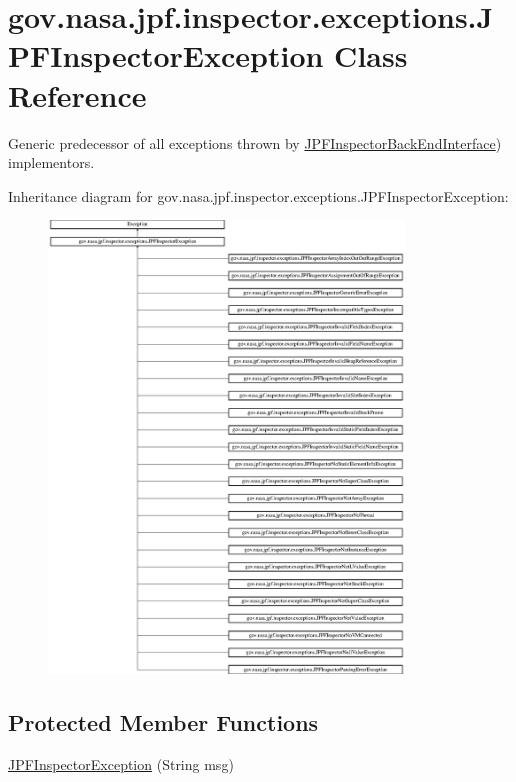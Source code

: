 \hypertarget{classgov_1_1nasa_1_1jpf_1_1inspector_1_1exceptions_1_1_j_p_f_inspector_exception}{}\section{gov.\+nasa.\+jpf.\+inspector.\+exceptions.\+J\+P\+F\+Inspector\+Exception Class Reference}
\label{classgov_1_1nasa_1_1jpf_1_1inspector_1_1exceptions_1_1_j_p_f_inspector_exception}


Generic predecessor of all exceptions thrown by \hyperlink{}{J\+P\+F\+Inspector\+Back\+End\+Interface}) implementors.  


Inheritance diagram for gov.\+nasa.\+jpf.\+inspector.\+exceptions.\+J\+P\+F\+Inspector\+Exception\+:\begin{figure}[H]
\begin{center}
\leavevmode
\includegraphics[height=12.000000cm]{classgov_1_1nasa_1_1jpf_1_1inspector_1_1exceptions_1_1_j_p_f_inspector_exception}
\end{center}
\end{figure}
\subsection*{Protected Member Functions}
\begin{DoxyCompactItemize}
\item 
\hyperlink{classgov_1_1nasa_1_1jpf_1_1inspector_1_1exceptions_1_1_j_p_f_inspector_exception_a604a69a58509a5b491240b0f3af05190}{J\+P\+F\+Inspector\+Exception} (String msg)
\end{DoxyCompactItemize}
